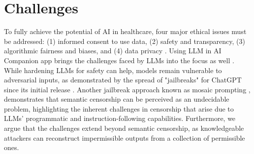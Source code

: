 \section{Challenges}
To fully achieve the potential of AI in healthcare, four major ethical issues must be addressed: (1) informed consent to use data, (2) safety and transparency, (3) algorithmic fairness and biases, and (4) data privacy \cite{gerke2020ethical}. Using LLM in AI Companion app brings the challenges faced by LLMs into the focus as well \cite{sarker2024llm}. While hardening LLMs for safety can help, models remain vulnerable to adversarial inputs, as demonstrated by the spread of "jailbreaks" for ChatGPT since its initial release \cite{andriushchenko2024jailbreaking}. Another jailbreak approach known as mosaic prompting \cite{glukhov2023llm}, demonstrates that semantic censorship can be perceived as an undecidable problem, highlighting the inherent challenges in censorship that arise due to LLMs' programmatic and instruction-following capabilities. Furthermore, we argue that the challenges extend beyond semantic censorship, as knowledgeable attackers can reconstruct impermissible outputs from a collection of permissible ones.